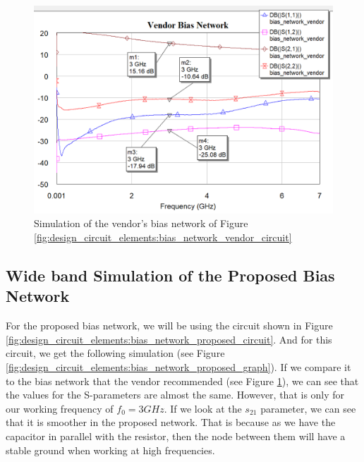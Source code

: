 \documentclass[12pt]{report} %
\begin{document}
\begin{figure}[htbp]
    \centering
    \includegraphics[width=1\linewidth]{images//design_circuit_elements/bias_network_vendor_graph.png}
    \caption{Simulation of the vendor's bias network of Figure \ref{fig:design_circuit_elements:bias_network_vendor_circuit}}
    \label{fig:design_circuit_elements:bias_network_vendor_graph}
\end{figure}

\subsection{Wide band Simulation of the Proposed Bias Network}

For the proposed bias network, we will be using the circuit shown in Figure \ref{fig:design_circuit_elements:bias_network_proposed_circuit}. And for this circuit, we get the following simulation (see Figure \ref{fig:design_circuit_elements:bias_network_proposed_graph}). If we compare it to the bias network that the vendor recommended (see Figure \ref{fig:design_circuit_elements:bias_network_vendor_graph}), we can see that the values for the S-parameters are almost the same. However, that is only for our working frequency of $f_0 = 3 GHz$. If we look at the $s_{21}$ parameter, we can see that it is smoother in the proposed network. That is because as we have the capacitor in parallel with the resistor, then the node between them will have a stable ground when working at high frequencies.
\end{document}
